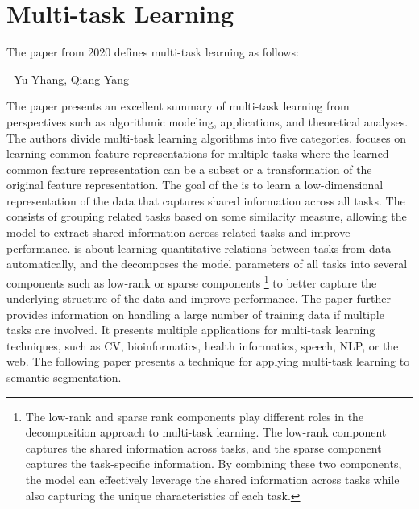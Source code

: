 \section{Multi-task Learning}
The paper  \cite{https://doi.org/10.48550/arxiv.2007.12668} from 2020 defines multi-task learning as follows:

 \hfill - Yu Yhang, Qiang Yang \cite{https://doi.org/10.48550/arxiv.2007.12668}


The paper presents an excellent summary of multi-task learning from perspectives such as algorithmic modeling, applications, and theoretical analyses. The authors divide multi-task learning algorithms into five categories.  focuses on learning common feature representations for multiple tasks where the learned common feature representation can be a subset or a transformation of the original feature representation. The goal of the  is to learn a low-dimensional representation of the data that captures shared information across all tasks. The  consists of grouping related tasks based on some similarity measure, allowing the model to extract shared information across related tasks and improve performance.  is about learning quantitative relations between tasks from data automatically, and the  decomposes the model parameters of all tasks into several components such as low-rank or sparse components \footnote{The low-rank and sparse rank components play different roles in the decomposition approach to multi-task learning. The low-rank component captures the shared information across tasks, and the sparse component captures the task-specific information. By combining these two components, the model can effectively leverage the shared information across tasks while also capturing the unique characteristics of each task.} to better capture the underlying structure of the data and improve performance. The paper further provides information on handling a large number of training data if multiple tasks are involved. It presents multiple applications for multi-task learning techniques, such as \ac{CV}, bioinformatics, health informatics, speech, \ac{NLP}, or the web. The following paper presents a technique for applying multi-task learning to semantic segmentation.

